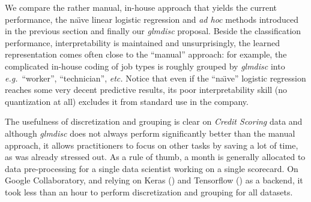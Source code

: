 We compare the rather manual, in-house approach that yields the current performance, the na\"{\i}ve linear logistic regression and \textit{ad hoc} methods introduced in the previous section and finally our \textit{glmdisc} proposal. Beside the classification performance, interpretability is maintained and unsurprisingly, the learned representation comes often close to the ``manual'' approach: for example, the complicated in-house coding of job types is roughly grouped by \textit{glmdisc} into \textit{e.g.}\ ``worker'', ``technician'', \textit{etc.} Notice that even if the ``na\"{\i}ve'' logistic regression reaches some very decent predictive results, its poor interpretability skill (no quantization at all) excludes it from standard use in the company.

The usefulness of discretization and grouping is clear on \textit{Credit Scoring} data and although \textit{glmdisc} does not always perform significantly better than the manual approach, it allows practitioners to focus on other tasks by saving a lot of time, as was already stressed out. As a rule of thumb, a month is generally allocated to data pre-processing for a single data scientist working on a single scorecard. On Google Collaboratory, and relying on Keras (\cite{chollet2015keras}) and Tensorflow (\cite{tensorflow2015-whitepaper}) as a backend, it took less than an hour to perform discretization and grouping for all datasets.



